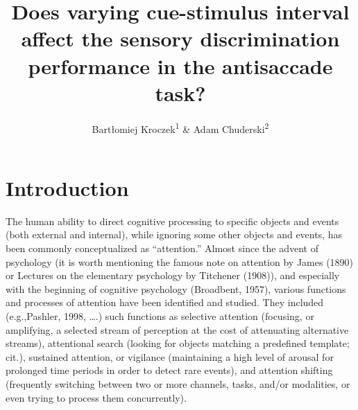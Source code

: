 \documentclass[
  man,draftall]{apa6}
\title{Does varying cue-stimulus interval affect the sensory discrimination performance in the antisaccade task?}
\author{Bartłomiej Kroczek\textsuperscript{1} \& Adam Chuderski\textsuperscript{2}}
\date{}
\affiliation{\vspace{0.5cm}\textsuperscript{1} Institute of Psychology, Jagiellonian University, Krakow, Poland\\\textsuperscript{2} Department of Cognitive Science, Jagiellonian University, Krakow, Poland}
\begin{document}
\maketitle

\hypertarget{introduction}{%
\section{Introduction}\label{introduction}}

The human ability to direct cognitive processing to specific objects and events (both external and
internal), while ignoring some other objects and events, has been commonly conceptualized as
``attention.'' Almost since the advent of psychology (it is worth mentioning the famous note on
attention by James (1890) or Lectures on the elementary psychology by
Titchener (1908)), and especially with the beginning of cognitive psychology
(Broadbent, 1957), various functions and processes of attention have been
identified and studied. They included (e.g.,Pashler, 1998, \ldots.) such functions as selective
attention (focusing, or amplifying, a selected stream of perception at the cost of attenuating
alternative streams), attentional search (looking for objects matching a predefined template; cit.),
sustained attention, or vigilance (maintaining a high level of arousal for prolonged time periods in
order to detect rare events), and attention shifting (frequently switching between two or more
channels, tasks, and/or modalities, or even trying to process them concurrently).
\end{document}
